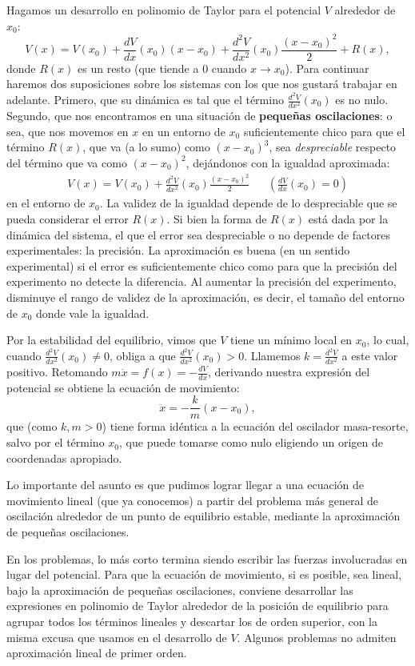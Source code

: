 \documentclass[a4paper,spanish]{article}
\numberwithin{equation}{section}
\begin{document}
Hagamos un desarrollo en polinomio de Taylor para el potencial $V$ alrededor de $x_0$:
		\[
			V(x) = V(x_0) + \frac{dV}{dx}(x_0) (x-x_0) + \frac{d^2V}{dx^2}(x_0) \frac{(x-x_0)^2}{2} + R(x),
		\]
donde $R(x)$ es un resto (que tiende a 0 cuando $x\to x_0$). Para continuar haremos dos suposiciones sobre los sistemas con los que nos gustar\'a trabajar en adelante. Primero, que su din\'amica es tal que el t\'ermino $\frac{d^2V}{dx^2}(x_0)$ es no nulo. Segundo, que nos encontramos en una situaci\'on de \textbf{peque\~nas oscilaciones}: o sea, que nos movemos en $x$ en un entorno de $x_0$ suficientemente chico para que el t\'ermino $R(x)$, que va (a lo sumo) como $(x-x_0)^3$, sea \textit{despreciable} respecto del t\'ermino que va como $(x-x_0)^2$, dej\'andonos con la igualdad aproximada:
		\begin{align*}
			V(x) = V(x_0) + \frac{d^2V}{dx^2}(x_0) \frac{(x-x_0)^2}{2} & &
			(\frac{dV}{dx}(x_0)=0)
		\end{align*}
en el entorno de $x_0$. La validez de la igualdad depende de lo despreciable que se pueda considerar el error $R(x)$. Si bien la forma de $R(x)$ est\'a dada por la din\'amica del sistema, el que el error sea despreciable o no depende de factores experimentales: la precisi\'on. La aproximaci\'on es buena (en un sentido experimental) si el error es suficientemente chico como para que la precisi\'on del experimento no detecte la diferencia. Al aumentar la precisi\'on del experimento, disminuye el rango de validez de la aproximaci\'on, es decir, el tama\~no del entorno de $x_0$ donde vale la igualdad.

Por la estabilidad del equilibrio, vimos que $V$ tiene un m\'inimo local en $x_0$, lo cual, cuando $\frac{d^2V}{dx^2}(x_0)\neq0$, obliga a que $\frac{d^2V}{dx^2}(x_0)>0$. Llamemos $k=\frac{d^2V}{dx^2}$ a este valor positivo. Retomando $m\ddot{x}=f(x)=-\frac{dV}{dx}$, derivando nuestra expresi\'on del potencial se obtiene la ecuaci\'on de movimiento:
		\[
			\ddot{x}=-\frac{k}{m}(x-x_0),
		\]
que (como $k,m>0$) tiene forma id\'entica a la ecuaci\'on del oscilador masa-resorte, salvo por el t\'ermino $x_0$, que puede tomarse como nulo eligiendo un origen de coordenadas apropiado. 

Lo importante del asunto es que pudimos lograr llegar a una ecuaci\'on de movimiento lineal (que ya conocemos) a partir del problema m\'as general de oscilaci\'on alrededor de un punto de equilibrio estable, mediante la aproximaci\'on de peque\~nas oscilaciones.

En los problemas, lo m\'as corto termina siendo escribir las fuerzas involucradas en lugar del potencial. Para que la ecuaci\'on de movimiento, si es posible, sea lineal, bajo la aproximaci\'on de peque\~nas oscilaciones, conviene desarrollar las expresiones en polinomio de Taylor alrededor de la posici\'on de equilibrio para agrupar todos los t\'erminos lineales y descartar los de orden superior, con la misma excusa que usamos en el desarrollo de $V$. Algunos problemas no admiten aproximaci\'on lineal de primer orden.
\end{document}
